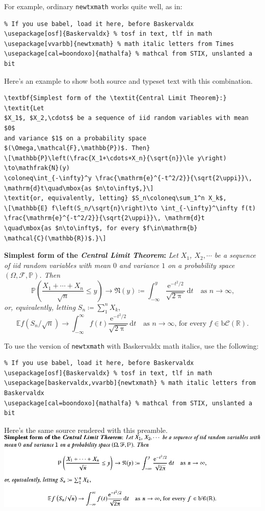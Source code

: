 \documentclass[11pt]{article}
\begin{document}
For example, ordinary {\tt newtxmath} works quite well, as in:
\begin{verbatim}
% If you use babel, load it here, before Baskervaldx
\usepackage[osf]{Baskervaldx} % tosf in text, tlf in math
\usepackage[vvarbb]{newtxmath} % math italic letters from Times
\usepackage[cal=boondoxo]{mathalfa} % mathcal from STIX, unslanted a bit
\end{verbatim}
Here's an example to show both source and typeset text with this combination.
\begin{verbatim}
\textbf{Simplest form of the \textit{Central Limit Theorem}:} \textit{Let
$X_1$, $X_2,\cdots$ be a sequence of iid random variables with mean $0$ 
and variance $1$ on a probability space $(\Omega,\mathcal{F},\mathbb{P})$. Then}
\[\mathbb{P}\left(\frac{X_1+\cdots+X_n}{\sqrt{n}}\le y\right) \to\mathfrak{N}(y) 
\coloneq\int_{-\infty}^y \frac{\mathrm{e}^{-t^2/2}}{\sqrt{2\uppi}}\,
\mathrm{d}t\quad\mbox{as $n\to\infty$,}\]
\textit{or, equivalently, letting} $S_n\coloneq\sum_1^n X_k$,
\[\mathbb{E} f\left(S_n/\sqrt{n}\right)\to \int_{-\infty}^\infty f(t)
\frac{\mathrm{e}^{-t^2/2}}{\sqrt{2\uppi}}\, \mathrm{d}t
\quad\mbox{as $n\to\infty$, for every $f\in\mathrm{b}
\mathcal{C}(\mathbb{R})$.}\]
\end{verbatim}

\textbf{Simplest form of the \textit{Central Limit Theorem}:} \textit{Let
$X_1$, $X_2,\cdots$ be a sequence of iid random variables with mean $0$ 
and variance $1$ on a probability space $(\Omega,\mathcal{F},\mathbb{P})$. Then}
\[\mathbb{P}\left(\frac{X_1+\cdots+X_n}{\sqrt{n}}\le y\right)\to\mathfrak{N}(y)\coloneq
\int_{-\infty}^y \frac{\mathrm{e}^{-t^2/2}}{\sqrt{2\uppi}}\,
\mathrm{d}t\quad\mbox{as $n\to\infty$,}\]
\textit{or, equivalently, letting} $S_n\coloneq\sum_1^n X_k$,
\[\mathbb{E} f\left(S_n/\sqrt{n}\right)\to \int_{-\infty}^\infty f(t)
\frac{\mathrm{e}^{-t^2/2}}{\sqrt{2\uppi}}\,\mathrm{d}t
\quad\mbox{as $n\to\infty$, for every $f\in\mathrm{b}
\mathcal{C}(\mathbb{R})$.}\]

To use the version of {\tt newtxmath} with Baskervaldx math italics, use the following:\\
\begin{verbatim}
% If you use babel, load it here, before Baskervaldx
\usepackage[osf]{Baskervaldx} % tosf in text, tlf in math
\usepackage[baskervaldx,vvarbb]{newtxmath} % math italic letters from Baskervaldx
\usepackage[cal=boondoxo]{mathalfa} % mathcal from STIX, unslanted a bit
\end{verbatim}
Here's the same  source rendered  with this preamble.\\[10pt]
\includegraphics{baskervaldxmatheg-crop}

 
\end{document}
